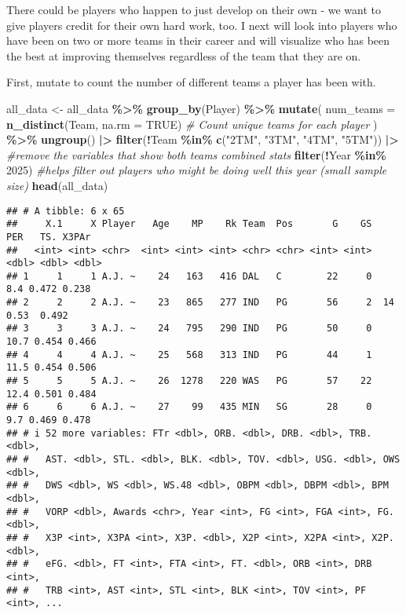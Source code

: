 \documentclass[
]{article}
\newenvironment{Shaded}{\begin{snugshade}}{\end{snugshade}}
\newcommand{\AttributeTok}[1]{\textcolor[rgb]{0.13,0.29,0.53}{#1}}
\newcommand{\CommentTok}[1]{\textcolor[rgb]{0.56,0.35,0.01}{\textit{#1}}}
\newcommand{\ConstantTok}[1]{\textcolor[rgb]{0.56,0.35,0.01}{#1}}
\newcommand{\DecValTok}[1]{\textcolor[rgb]{0.00,0.00,0.81}{#1}}
\newcommand{\FunctionTok}[1]{\textcolor[rgb]{0.13,0.29,0.53}{\textbf{#1}}}
\newcommand{\NormalTok}[1]{#1}
\newcommand{\OtherTok}[1]{\textcolor[rgb]{0.56,0.35,0.01}{#1}}
\newcommand{\SpecialCharTok}[1]{\textcolor[rgb]{0.81,0.36,0.00}{\textbf{#1}}}
\newcommand{\StringTok}[1]{\textcolor[rgb]{0.31,0.60,0.02}{#1}}
\begin{document}
There could be players who happen to just develop on their own - we want
to give players credit for their own hard work, too. I next will look
into players who have been on two or more teams in their career and will
visualize who has been the best at improving themselves regardless of
the team that they are on.

First, mutate to count the number of different teams a player has been
with.

\begin{Shaded}
\begin{Highlighting}[]
\NormalTok{all\_data }\OtherTok{\textless{}{-}}\NormalTok{ all\_data }\SpecialCharTok{\%\textgreater{}\%}
  \FunctionTok{group\_by}\NormalTok{(Player) }\SpecialCharTok{\%\textgreater{}\%}
  \FunctionTok{mutate}\NormalTok{(}
    \AttributeTok{num\_teams =} \FunctionTok{n\_distinct}\NormalTok{(Team, }\AttributeTok{na.rm =} \ConstantTok{TRUE}\NormalTok{)  }\CommentTok{\# Count unique teams for each player}
\NormalTok{  ) }\SpecialCharTok{\%\textgreater{}\%}
  \FunctionTok{ungroup}\NormalTok{() }\SpecialCharTok{|\textgreater{}}
\FunctionTok{filter}\NormalTok{(}\SpecialCharTok{!}\NormalTok{Team }\SpecialCharTok{\%in\%} \FunctionTok{c}\NormalTok{(}\StringTok{"2TM"}\NormalTok{, }\StringTok{"3TM"}\NormalTok{, }\StringTok{"4TM"}\NormalTok{, }\StringTok{"5TM"}\NormalTok{)) }\SpecialCharTok{|\textgreater{}} \CommentTok{\#remove the variables that show both teams combined stats }
\FunctionTok{filter}\NormalTok{(}\SpecialCharTok{!}\NormalTok{Year }\SpecialCharTok{\%in\%} \DecValTok{2025}\NormalTok{) }\CommentTok{\#helps filter out players who might be doing well this year (small sample size)}
\FunctionTok{head}\NormalTok{(all\_data)}
\end{Highlighting}
\end{Shaded}

\begin{verbatim}
## # A tibble: 6 x 65
##     X.1     X Player   Age    MP    Rk Team  Pos       G    GS   PER   TS. X3PAr
##   <int> <int> <chr>  <int> <int> <int> <chr> <chr> <int> <int> <dbl> <dbl> <dbl>
## 1     1     1 A.J. ~    24   163   416 DAL   C        22     0   8.4 0.472 0.238
## 2     2     2 A.J. ~    23   865   277 IND   PG       56     2  14   0.53  0.492
## 3     3     3 A.J. ~    24   795   290 IND   PG       50     0  10.7 0.454 0.466
## 4     4     4 A.J. ~    25   568   313 IND   PG       44     1  11.5 0.454 0.506
## 5     5     5 A.J. ~    26  1278   220 WAS   PG       57    22  12.4 0.501 0.484
## 6     6     6 A.J. ~    27    99   435 MIN   SG       28     0   9.7 0.469 0.478
## # i 52 more variables: FTr <dbl>, ORB. <dbl>, DRB. <dbl>, TRB. <dbl>,
## #   AST. <dbl>, STL. <dbl>, BLK. <dbl>, TOV. <dbl>, USG. <dbl>, OWS <dbl>,
## #   DWS <dbl>, WS <dbl>, WS.48 <dbl>, OBPM <dbl>, DBPM <dbl>, BPM <dbl>,
## #   VORP <dbl>, Awards <chr>, Year <int>, FG <int>, FGA <int>, FG. <dbl>,
## #   X3P <int>, X3PA <int>, X3P. <dbl>, X2P <int>, X2PA <int>, X2P. <dbl>,
## #   eFG. <dbl>, FT <int>, FTA <int>, FT. <dbl>, ORB <int>, DRB <int>,
## #   TRB <int>, AST <int>, STL <int>, BLK <int>, TOV <int>, PF <int>, ...
\end{verbatim}
\end{document}
